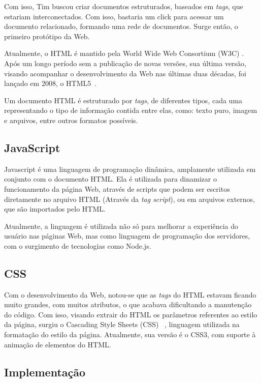 Com isso, Tim buscou criar documentos estruturados, baseados em \textit{
tags}, que estariam interconectados. Com isso, bastaria um click para acessar um documento relacionado, formando uma rede de documentos. Surge então, o primeiro protótipo da Web.

Atualmente, o HTML é mantido pela World Wide Web Consortium (W3C) . Após um longo período sem a publicação de novas versões, sua última versão, visando acompanhar o desenvolvimento da Web nas últimas duas décadas, foi lançado em 2008, o HTML5~\cite{htmlw3cs}.  

Um documento HTML é estruturado por \textit{tags}, de diferentes tipos, cada uma representando o tipo de informação contida entre elas, como: texto puro, imagem e arquivos, entre outros formatos possíveis.


\subsection{JavaScript}

Javascript é uma linguagem de programação dinâmica, amplamente utilizada em conjunto com o documento HTML. Ela é utilizada para dinamizar o funcionamento da página Web, através de scripts que podem ser escritos diretamente no arquivo HTML (Através da \textit{tag script}), ou em arquivos externos, que são importados pelo HTML.

Atualmente, a linguagem é utilizada não só para melhorar a experiência do usuário nas páginas Web, mas como linguagem de programação dos servidores, com o surgimento de tecnologias como Node.js.

\subsection{CSS}

Com o desenvolvimento da Web, notou-se que as \textit{tags} do HTML estavam ficando muito grandes, com muitos atributos, o que acabava dificultando a manutenção do código. Com isso, visando extrair do HTML os parâmetros referentes ao estilo da página, surgiu o Cascading Style Sheets (CSS) ~, linguagem utilizada na formatação do estilo da página. Atualmente, sua versão é o CSS3, com suporte à animação de elementos do HTML.

\subsection{Implementação}

